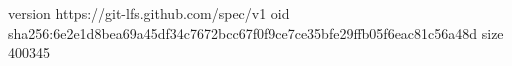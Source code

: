 version https://git-lfs.github.com/spec/v1
oid sha256:6e2e1d8bea69a45df34c7672bcc67f0f9ce7ce35bfe29ffb05f6eac81c56a48d
size 400345
